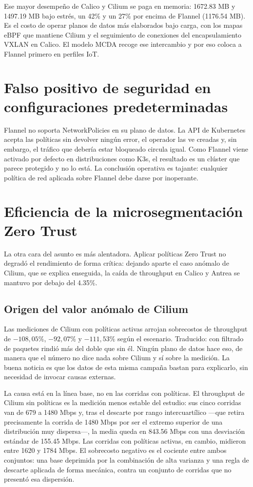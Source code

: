 Ese mayor desempeño de Calico y Cilium se paga en memoria: 1672.83 MB y 1497.19 MB bajo estrés, un 42\% y un 27\% por encima de Flannel (1176.54 MB). Es el costo de operar planos de datos más elaborados bajo carga, con los mapas eBPF que mantiene Cilium y el seguimiento de conexiones del encapsulamiento VXLAN en Calico. El modelo MCDA recoge ese intercambio y por eso coloca a Flannel primero en perfiles IoT.

\section{Falso positivo de seguridad en configuraciones predeterminadas}
Flannel no soporta NetworkPolicies en su plano de datos. La API de Kubernetes acepta las políticas sin devolver ningún error, el operador las ve creadas y, sin embargo, el tráfico que debería estar bloqueado circula igual. Como Flannel viene activado por defecto en distribuciones como K3s, el resultado es un clúster que parece protegido y no lo está. La conclusión operativa es tajante: cualquier política de red aplicada sobre Flannel debe darse por inoperante.

\section{Eficiencia de la microsegmentación Zero Trust}
La otra cara del asunto es más alentadora. Aplicar políticas Zero Trust no degradó el rendimiento de forma crítica: dejando aparte el caso anómalo de Cilium, que se explica enseguida, la caída de throughput en Calico y Antrea se mantuvo por debajo del 4.35\%.

\subsection{Origen del valor anómalo de Cilium} \label{sec:anomalo_cilium}

Las mediciones de Cilium con políticas activas arrojan sobrecostos de throughput de $-108{,}05\%$, $-92{,}07\%$ y $-111{,}53\%$ según el escenario. Traducido: con filtrado de paquetes rindió más del doble que sin él. Ningún plano de datos hace eso, de manera que el número no dice nada sobre Cilium y sí sobre la medición. La buena noticia es que los datos de esta misma campaña bastan para explicarlo, sin necesidad de invocar causas externas.

La causa está en la línea base, no en las corridas con políticas. El throughput de Cilium sin políticas es la medición menos estable del estudio: sus cinco corridas van de 679 a 1480 Mbps y, tras el descarte por rango intercuartílico ---que retira precisamente la corrida de 1480 Mbps por ser el extremo superior de una distribución muy dispersa---, la media queda en 843.56 Mbps con una desviación estándar de 155.45 Mbps. Las corridas con políticas activas, en cambio, midieron entre 1620 y 1784 Mbps. El sobrecosto negativo es el cociente entre ambos conjuntos: una base deprimida por la combinación de alta varianza y una regla de descarte aplicada de forma mecánica, contra un conjunto de corridas que no presentó esa dispersión.

